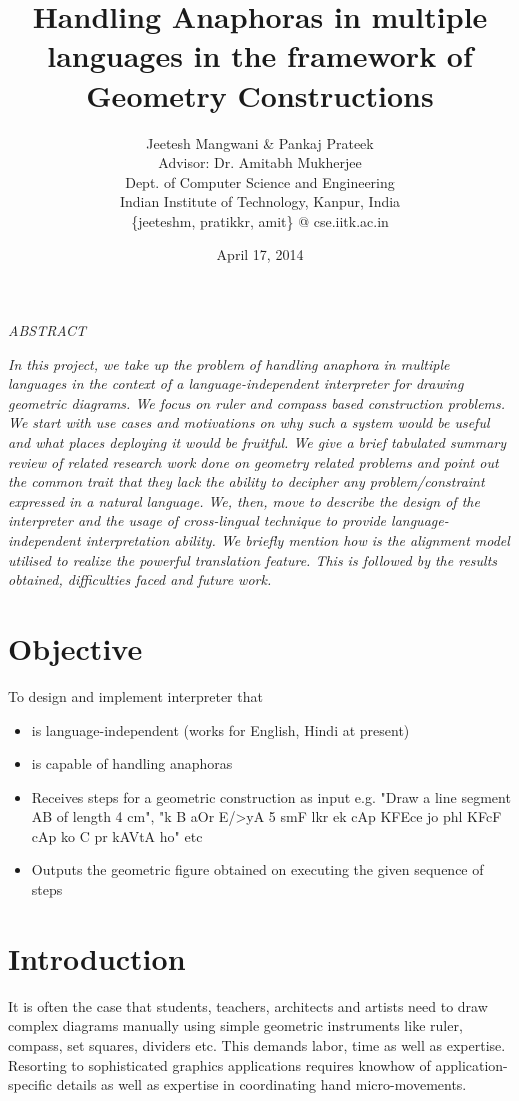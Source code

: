 \def\DevnagVersion{2.15}\documentclass[12pt]{article}
\title{Handling Anaphoras in multiple languages in the framework of Geometry Constructions}
\author{Jeetesh Mangwani \& Pankaj Prateek\\
	Advisor: Dr. Amitabh Mukherjee\\
        Dept. of Computer Science and Engineering\\
	Indian Institute of Technology, Kanpur, India\\
	\{jeeteshm, pratikkr, amit\} @ cse.iitk.ac.in}
\date{April 17, 2014}
\begin{document}
\maketitle
\begin{center}{\b \em ABSTRACT}\end{center}
{\em In this project, we take up the problem of handling anaphora in multiple languages in the context of a language-independent interpreter for drawing geometric diagrams. We focus on ruler and compass based construction problems. We start with use cases and motivations on why such a system would be useful and what places deploying it would be fruitful. We give a brief tabulated summary review of related research work done on geometry related problems and point out the common trait that they lack the ability to decipher any problem/constraint expressed in a natural language. We, then, move to describe the design of the interpreter and the usage of cross-lingual technique to provide language-independent interpretation ability. We briefly mention how is the alignment model utilised to realize the powerful translation feature. This is followed by the results obtained, difficulties faced and future work.}

\section{Objective}
To design and implement interpreter that
\begin{itemize}
	\item is language-independent (works for English, Hindi at present)
  \item is capable of handling anaphoras
	\item Receives steps for a geometric construction as input e.g. "Draw a line segment AB of length 4 cm", "{\dn k\?{\qva}} B {\dn aOr E/>yA} 5 {\dn s\?mF l\?kr ek cAp KF{\qva}Ece jo phl\? KF{\qva}cF cAp ko} C {\dn pr kAVtA ho}" etc
	\item Outputs the geometric figure obtained on executing the given sequence of steps 
\end{itemize}

\section{Introduction}
It is often the case that students, teachers, architects and artists need to draw complex diagrams manually using simple geometric instruments like ruler, compass, set squares, dividers etc. This demands labor, time as well as expertise. Resorting to sophisticated graphics applications requires knowhow of application-specific details as well as expertise in coordinating hand micro-movements.\\
\end{document}
